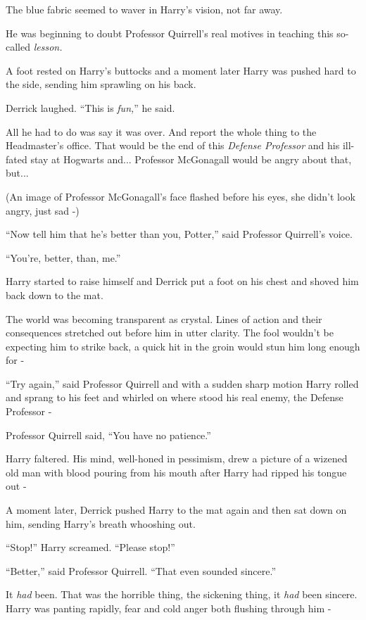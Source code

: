 The blue fabric seemed to waver in Harry's vision, not far away.

He was beginning to doubt Professor Quirrell's real motives in teaching this so-called \emph{lesson.}

A foot rested on Harry's buttocks and a moment later Harry was pushed hard to the side, sending him sprawling on his back.

Derrick laughed. ``This is \emph{fun,}'' he said.

All he had to do was say it was over. And report the whole thing to the Headmaster's office. That would be the end of this \emph{Defense Professor} and his ill-fated stay at Hogwarts and... Professor McGonagall would be angry about that, but...

(An image of Professor McGonagall's face flashed before his eyes, she didn't look angry, just sad -)

``Now tell him that he's better than you, Potter,'' said Professor Quirrell's voice.

``You're, better, than, me.''

Harry started to raise himself and Derrick put a foot on his chest and shoved him back down to the mat.

The world was becoming transparent as crystal. Lines of action and their consequences stretched out before him in utter clarity. The fool wouldn't be expecting him to strike back, a quick hit in the groin would stun him long enough for -

``Try again,'' said Professor Quirrell and with a sudden sharp motion Harry rolled and sprang to his feet and whirled on where stood his real enemy, the Defense Professor -

Professor Quirrell said, ``You have no patience.''

Harry faltered. His mind, well-honed in pessimism, drew a picture of a wizened old man with blood pouring from his mouth after Harry had ripped his tongue out -

A moment later, Derrick pushed Harry to the mat again and then sat down on him, sending Harry's breath whooshing out.

``Stop!'' Harry screamed. ``Please stop!''

``Better,'' said Professor Quirrell. ``That even sounded sincere.''

It \emph{had} been. That was the horrible thing, the sickening thing, it \emph{had} been sincere. Harry was panting rapidly, fear and cold anger both flushing through him -

